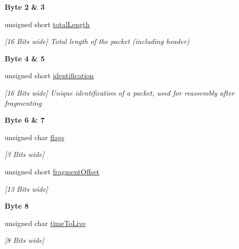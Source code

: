 \begin{Indent}\textbf{ Byte 2 \& 3}\par
\begin{DoxyCompactItemize}
\item 
unsigned short \mbox{\hyperlink{structipv4_header___ade4cb23064ef2e88561a8cac4ec01a23}{total\+Length}}
\begin{DoxyCompactList}\small\item\em \mbox{[}16 Bits wide\mbox{]} Total length of the packet (including header) \end{DoxyCompactList}\end{DoxyCompactItemize}
\end{Indent}
\begin{Indent}\textbf{ Byte 4 \& 5}\par
\begin{DoxyCompactItemize}
\item 
unsigned short \mbox{\hyperlink{structipv4_header___a44335dee0f0de11240d5e328cd2f2adb}{identification}}
\begin{DoxyCompactList}\small\item\em \mbox{[}16 Bits wide\mbox{]} Unique identification of a packet, used for reassembly after fragmenting \end{DoxyCompactList}\end{DoxyCompactItemize}
\end{Indent}
\begin{Indent}\textbf{ Byte 6 \& 7}\par
\begin{DoxyCompactItemize}
\item 
unsigned char \mbox{\hyperlink{structipv4_header___a78ac89a4a0f57ffa7c2ecf31749aa390}{flags}}
\begin{DoxyCompactList}\small\item\em \mbox{[}3 Bits wide\mbox{]} \end{DoxyCompactList}\item 
unsigned short \mbox{\hyperlink{structipv4_header___a0b5fddb65b6184b1060e641eec5afda0}{fragment\+Offset}}
\begin{DoxyCompactList}\small\item\em \mbox{[}13 Bits wide\mbox{]} \end{DoxyCompactList}\end{DoxyCompactItemize}
\end{Indent}
\begin{Indent}\textbf{ Byte 8}\par
\begin{DoxyCompactItemize}
\item 
unsigned char \mbox{\hyperlink{structipv4_header___afbec676e4d862677fd0eb120b7bb89c6}{time\+To\+Live}}
\begin{DoxyCompactList}\small\item\em \mbox{[}8 Bits wide\mbox{]} \end{DoxyCompactList}\end{DoxyCompactItemize}
\end{Indent}
